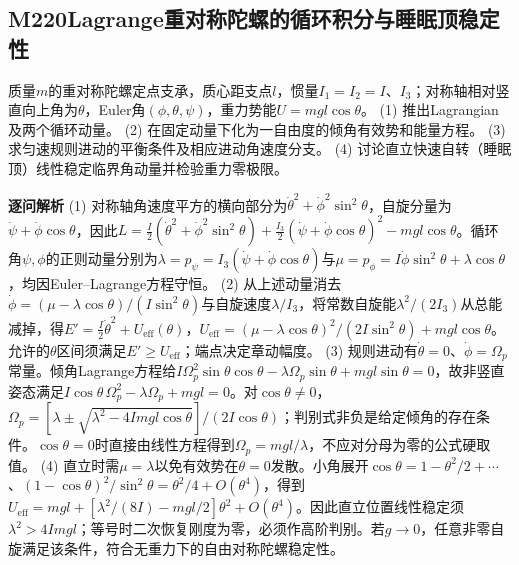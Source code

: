\subsection*{M220\quad Lagrange重对称陀螺的循环积分与睡眠顶稳定性}
质量$m$的重对称陀螺定点支承，质心距支点$l$，惯量$I_1=I_2=I$、$I_3$；对称轴相对竖直向上角为$\theta$，Euler角$(\phi,\theta,\psi)$，重力势能$U=mgl\cos\theta$。
(1) 推出Lagrangian及两个循环动量。
(2) 在固定动量下化为一自由度的倾角有效势和能量方程。
(3) 求匀速规则进动的平衡条件及相应进动角速度分支。
(4) 讨论直立快速自转（睡眠顶）线性稳定临界角动量并检验重力零极限。
\par\textbf{逐问解析}
(1) 对称轴角速度平方的横向部分为$\dot\theta^2+\dot\phi^2\sin^2\theta$，自旋分量为$\dot\psi+\dot\phi\cos\theta$，因此$L=\frac I2(\dot\theta^2+\dot\phi^2\sin^2\theta)+\frac{I_3}2(\dot\psi+\dot\phi\cos\theta)^2-mgl\cos\theta$。循环角$\psi,\phi$的正则动量分别为$\lambda=p_\psi=I_3(\dot\psi+\dot\phi\cos\theta)$与$\mu=p_\phi=I\dot\phi\sin^2\theta+\lambda\cos\theta$，均因Euler–Lagrange方程守恒。
(2) 从上述动量消去$\dot\phi=(\mu-\lambda\cos\theta)/(I\sin^2\theta)$与自旋速度$\lambda/I_3$，将常数自旋能$\lambda^2/(2I_3)$从总能减掉，得$E'=\frac I2\dot\theta^2+U_{\mathrm{eff}}(\theta)$，$U_{\mathrm{eff}}=(\mu-\lambda\cos\theta)^2/(2I\sin^2\theta)+mgl\cos\theta$。允许的$\theta$区间须满足$E'\ge U_{\mathrm{eff}}$；端点决定章动幅度。
(3) 规则进动有$\dot\theta=0$、$\dot\phi=\Omega_p$常量。倾角Lagrange方程给$I\Omega_p^2\sin\theta\cos\theta-\lambda\Omega_p\sin\theta+mgl\sin\theta=0$，故非竖直姿态满足$I\cos\theta\,\Omega_p^2-\lambda\Omega_p+mgl=0$。对$\cos\theta\ne0$，$\Omega_p=[\lambda\pm\sqrt{\lambda^2-4Imgl\cos\theta}]/(2I\cos\theta)$；判别式非负是给定倾角的存在条件。$\cos\theta=0$时直接由线性方程得到$\Omega_p=mgl/\lambda$，不应对分母为零的公式硬取值。
(4) 直立时需$\mu=\lambda$以免有效势在$\theta=0$发散。小角展开$\cos\theta=1-\theta^2/2+\cdots$、$(1-\cos\theta)^2/\sin^2\theta=\theta^2/4+O(\theta^4)$，得到$U_{\mathrm{eff}}=mgl+[\lambda^2/(8I)-mgl/2]\theta^2+O(\theta^4)$。因此直立位置线性稳定须$\lambda^2>4Imgl$；等号时二次恢复刚度为零，必须作高阶判别。若$g\to0$，任意非零自旋满足该条件，符合无重力下的自由对称陀螺稳定性。
\par\medskip
